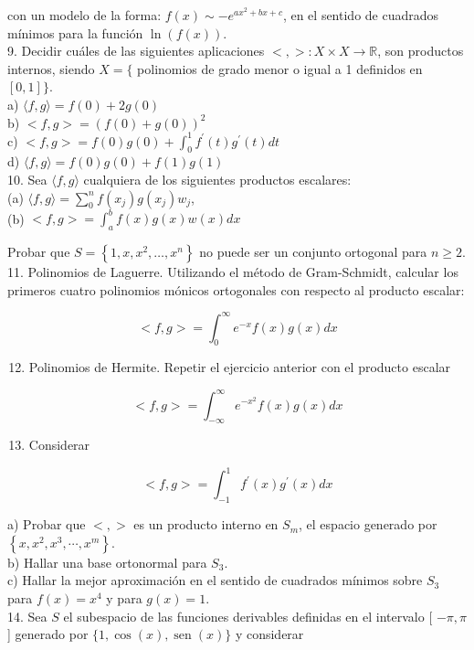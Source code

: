 \documentclass[10pt]{article}
\begin{document}
con un modelo de la forma: $f(x) \sim-e^{a x^{2}+b x+c}$, en el sentido de cuadrados mínimos para la función $\ln (f(x))$.\\
9. Decidir cuáles de las siguientes aplicaciones $<,>: X \times X \rightarrow \mathbb{R}$, son productos internos, siendo $X=\{$ polinomios de grado menor o igual a 1 definidos en $[0,1]\}$.\\
a) $\langle f, g\rangle=f(0)+2 g(0)$\\
b) $<f, g>=(f(0)+g(0))^{2}$\\
c) $<f, g>=f(0) g(0)+\int_{0}^{1} f^{\prime}(t) g^{\prime}(t) d t$\\
d) $\langle f, g\rangle=f(0) g(0)+f(1) g(1)$\\
10. Sea $\langle f, g\rangle$ cualquiera de los siguientes productos escalares:\\
(a) $\langle f, g\rangle=\sum_{0}^{n} f\left(x_{j}\right) g\left(x_{j}\right) w_{j}$,\\
(b) $<f, g>=\int_{a}^{b} f(x) g(x) w(x) d x$

Probar que $S=\left\{1, x, x^{2}, \ldots, x^{n}\right\}$ no puede ser un conjunto ortogonal para $n \geq 2$.\\
11. Polinomios de Laguerre. Utilizando el método de Gram-Schmidt, calcular los primeros cuatro polinomios mónicos ortogonales con respecto al producto escalar:

$$
<f, g>=\int_{0}^{\infty} e^{-x} f(x) g(x) d x
$$

\begin{enumerate}
  \setcounter{enumi}{11}
  \item Polinomios de Hermite. Repetir el ejercicio anterior con el producto escalar
\end{enumerate}

$$
<f, g>=\int_{-\infty}^{\infty} e^{-x^{2}} f(x) g(x) d x
$$

\begin{enumerate}
  \setcounter{enumi}{12}
  \item Considerar
\end{enumerate}

$$
<f, g>=\int_{-1}^{1} f^{\prime}(x) g^{\prime}(x) d x
$$

a) Probar que $<,>$ es un producto interno en $S_{m}$, el espacio generado por $\left\{x, x^{2}, x^{3}, \cdots, x^{m}\right\}$.\\
b) Hallar una base ortonormal para $S_{3}$.\\
c) Hallar la mejor aproximación en el sentido de cuadrados mínimos sobre $S_{3}$ para $f(x)=x^{4}$ y para $g(x)=1$.\\
14. Sea $S$ el subespacio de las funciones derivables definidas en el intervalo [ $-\pi, \pi$ ] generado por $\{1, \cos (x), \operatorname{sen}(x)\}$ y considerar
\end{document}
